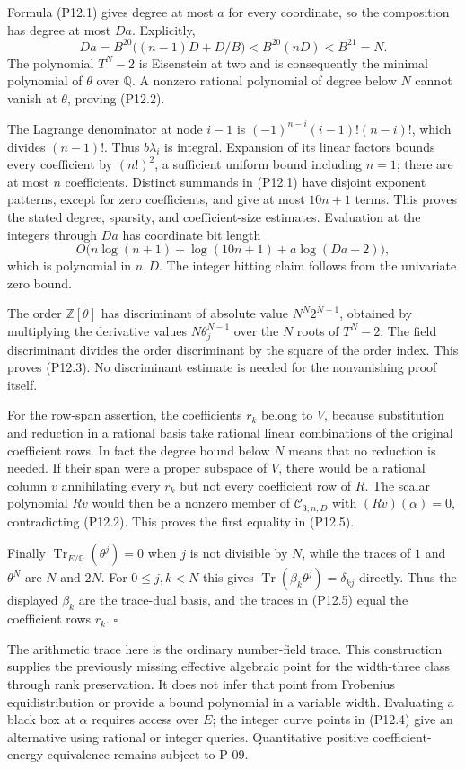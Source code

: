 Formula (P12.1) gives degree at most $a$ for every coordinate, so the composition has degree at most $Da$.  Explicitly,
\[
 Da=B^{20}\bigl((n-1)D+D/B\bigr)
      <B^{20}(nD)<B^{21}=N.
\]
The polynomial $T^N-2$ is Eisenstein at two and is consequently the minimal polynomial of $\theta$ over $\mathbb Q$.  A nonzero rational polynomial of degree below $N$ cannot vanish at $\theta$, proving (P12.2).

The Lagrange denominator at node $i-1$ is
$(-1)^{n-i}(i-1)!(n-i)!$, which divides $(n-1)!$.  Thus $b\lambda_i$ is integral.  Expansion of its linear factors bounds every coefficient by $(n!)^2$, a sufficient uniform bound including $n=1$; there are at most $n$ coefficients.  Distinct summands in (P12.1) have disjoint exponent patterns, except for zero coefficients, and give at most $10n+1$ terms.  This proves the stated degree, sparsity, and coefficient-size estimates.  Evaluation at the integers through $Da$ has coordinate bit length
\[
 O\bigl(n\log(n+1)+\log(10n+1)+a\log(Da+2)\bigr),
\]
which is polynomial in $n,D$.  The integer hitting claim follows from the univariate zero bound.

The order $\mathbb Z[\theta]$ has discriminant of absolute value
$N^N2^{N-1}$, obtained by multiplying the derivative values
$N\theta_j^{N-1}$ over the $N$ roots of $T^N-2$.  The field discriminant divides the order discriminant by the square of the order index.  This proves (P12.3).  No discriminant estimate is needed for the nonvanishing proof itself.

For the row-span assertion, the coefficients $r_k$ belong to $V$, because substitution and reduction in a rational basis take rational linear combinations of the original coefficient rows.  In fact the degree bound below $N$ means that no reduction is needed.  If their span were a proper subspace of $V$, there would be a rational column $v$ annihilating every $r_k$ but not every coefficient row of $R$.  The scalar polynomial $Rv$ would then be a nonzero member of $\mathcal C_{3,n,D}$ with $(Rv)(\alpha)=0$, contradicting (P12.2).  This proves the first equality in (P12.5).

Finally $\operatorname{Tr}_{E/\mathbb Q}(\theta^j)=0$ when $j$ is not divisible by $N$, while the traces of $1$ and $\theta^N$ are $N$ and $2N$.  For $0\le j,k<N$ this gives
$\operatorname{Tr}(\beta_k\theta^j)=\delta_{kj}$ directly.  Thus the displayed $\beta_k$ are the trace-dual basis, and the traces in (P12.5) equal the coefficient rows $r_k$.  $\square$

The arithmetic trace here is the ordinary number-field trace.  This construction supplies the previously missing effective algebraic point for the width-three class through rank preservation.  It does not infer that point from Frobenius equidistribution or provide a bound polynomial in a variable width.  Evaluating a black box at $\alpha$ requires access over $E$; the integer curve points in (P12.4) give an alternative using rational or integer queries.  Quantitative positive coefficient-energy equivalence remains subject to P-09.
